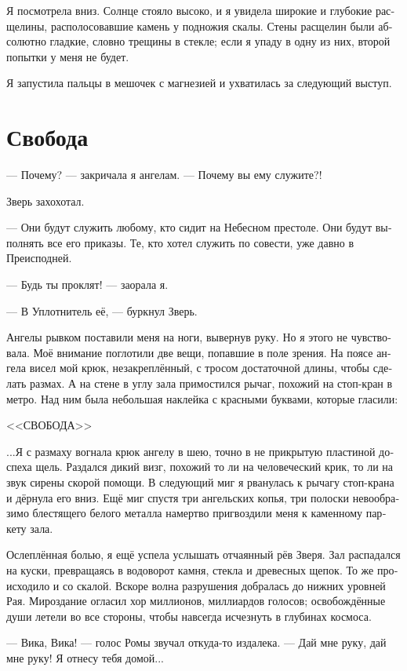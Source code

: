 \documentclass[a4paper,12pt,fleqn]{book}\usepackage{polyglossia}\setdefaultlanguage[babelshorthands=true]{russian}\setotherlanguage{english}\defaultfontfeatures{Ligatures=TeX,Mapping=tex-text}\usepackage{xcolor}\newcommand{\ml}[3]{#2}
\begin{document}
Я посмотрела вниз.
Солнце стояло высоко, и я увидела широкие и глубокие расщелины, располосовавшие камень у подножия скалы.
Стены расщелин были абсолютно гладкие, словно трещины в стекле;
если я упаду в одну из них, второй попытки у меня не будет.

Я запустила пальцы в мешочек с магнезией и ухватилась за следующий выступ.

\section{Свобода}

--- Почему? --- закричала я ангелам.
--- Почему вы ему служите?!

Зверь захохотал.

--- Они будут служить любому, кто сидит на Небесном престоле.
Они будут выполнять все его приказы.
Те, кто хотел служить по совести, уже давно в Преисподней.

--- Будь ты проклят! --- заорала я.

--- В Уплотнитель её, --- буркнул Зверь.

Ангелы рывком поставили меня на ноги, вывернув руку.
Но я этого не чувствовала.
Моё внимание поглотили две вещи, попавшие в поле зрения.
На поясе ангела висел мой крюк, незакреплённый, с тросом достаточной длины, чтобы сделать размах.
А на стене в углу зала примостился рычаг, похожий на стоп-кран в метро.
Над ним была небольшая наклейка с красными буквами, которые гласили:

<<СВОБОДА>>

...Я с размаху вогнала крюк ангелу в шею, точно в не прикрытую пластиной доспеха щель.
Раздался дикий визг, похожий то ли на человеческий крик, то ли на звук сирены скорой помощи.
В следующий миг я рванулась к рычагу стоп-крана и дёрнула его вниз.
Ещё миг спустя три ангельских копья, три полоски невообразимо блестящего белого металла намертво пригвоздили меня к каменному паркету зала.

Ослеплённая болью, я ещё успела услышать отчаянный рёв Зверя.
Зал распадался на куски, превращаясь в водоворот камня, стекла и древесных щепок.
То же происходило и со скалой.
Вскоре волна разрушения добралась до нижних уровней Рая.
Мироздание огласил хор миллионов, миллиардов голосов;
освобождённые души летели во все стороны, чтобы навсегда исчезнуть в глубинах космоса.

--- Вика, Вика! --- голос Ромы звучал откуда-то издалека.
--- Дай мне руку, дай мне руку! 
Я отнесу тебя домой...
\end{document}
